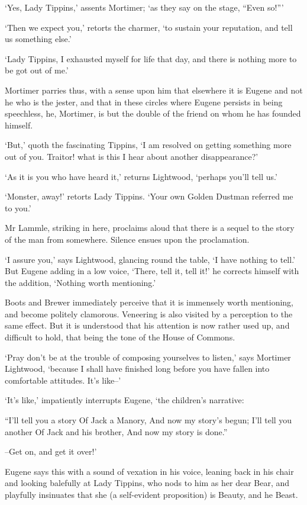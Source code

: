‘Yes, Lady Tippins,’ assents Mortimer; ‘as they say on the stage, “Even
so!”’

‘Then we expect you,’ retorts the charmer, ‘to sustain your reputation,
and tell us something else.’

‘Lady Tippins, I exhausted myself for life that day, and there is
nothing more to be got out of me.’

Mortimer parries thus, with a sense upon him that elsewhere it is Eugene
and not he who is the jester, and that in these circles where Eugene
persists in being speechless, he, Mortimer, is but the double of the
friend on whom he has founded himself.

‘But,’ quoth the fascinating Tippins, ‘I am resolved on getting
something more out of you. Traitor! what is this I hear about another
disappearance?’

‘As it is you who have heard it,’ returns Lightwood, ‘perhaps you’ll
tell us.’

‘Monster, away!’ retorts Lady Tippins. ‘Your own Golden Dustman referred
me to you.’

Mr Lammle, striking in here, proclaims aloud that there is a sequel
to the story of the man from somewhere. Silence ensues upon the
proclamation.

‘I assure you,’ says Lightwood, glancing round the table, ‘I have
nothing to tell.’ But Eugene adding in a low voice, ‘There, tell
it, tell it!’ he corrects himself with the addition, ‘Nothing worth
mentioning.’

Boots and Brewer immediately perceive that it is immensely worth
mentioning, and become politely clamorous. Veneering is also visited by
a perception to the same effect. But it is understood that his attention
is now rather used up, and difficult to hold, that being the tone of the
House of Commons.

‘Pray don’t be at the trouble of composing yourselves to listen,’ says
Mortimer Lightwood, ‘because I shall have finished long before you have
fallen into comfortable attitudes. It’s like--’

‘It’s like,’ impatiently interrupts Eugene, ‘the children’s narrative:

     “I’ll tell you a story
     Of Jack a Manory,
     And now my story’s begun;
     I’ll tell you another
     Of Jack and his brother,
     And now my story is done.”

--Get on, and get it over!’

Eugene says this with a sound of vexation in his voice, leaning back in
his chair and looking balefully at Lady Tippins, who nods to him as
her dear Bear, and playfully insinuates that she (a self-evident
proposition) is Beauty, and he Beast.

